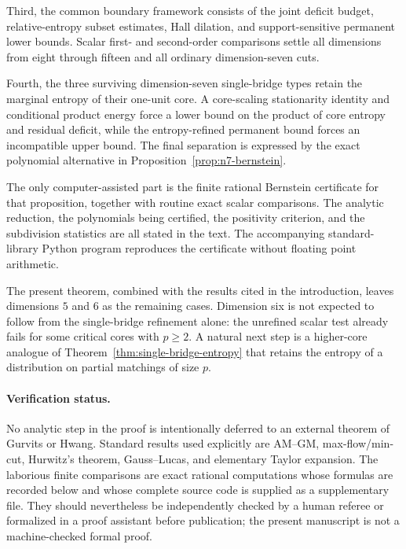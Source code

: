 \documentclass[11pt]{article}
\theoremstyle{definition}
\newcommand{\1}{\mathbf{1}}
\begin{document}
Third, the common boundary framework consists of the joint deficit budget,
relative-entropy subset estimates, Hall dilation, and support-sensitive
permanent lower bounds.  Scalar first- and second-order comparisons settle
all dimensions from eight through fifteen and all ordinary dimension-seven
cuts.

Fourth, the three surviving dimension-seven single-bridge types retain the
marginal entropy of their one-unit core.  A core-scaling stationarity identity
and conditional product energy force a lower bound on the product of core
entropy and residual deficit, while the entropy-refined permanent bound forces
an incompatible upper bound.  The final separation is expressed by the exact
polynomial alternative in Proposition~\ref{prop:n7-bernstein}.

The only computer-assisted part is the finite rational Bernstein certificate
for that proposition, together with routine exact scalar comparisons.  The
analytic reduction, the polynomials being certified, the positivity criterion,
and the subdivision statistics are all stated in the text.  The accompanying
standard-library Python program reproduces the certificate without floating
point arithmetic.

The present theorem, combined with the results cited in the introduction,
leaves dimensions $5$ and $6$ as the remaining cases.  Dimension six is not
expected to follow from the single-bridge refinement alone: the unrefined
scalar test already fails for some critical cores with $p\ge2$.  A natural
next step is a higher-core analogue of Theorem~\ref{thm:single-bridge-entropy}
that retains the entropy of a distribution on partial matchings of size
$p$.

\paragraph{Verification status.}
No analytic step in the proof is intentionally deferred to an external theorem of Gurvits or Hwang.  Standard results used explicitly are AM--GM, max-flow/min-cut, Hurwitz's theorem, Gauss--Lucas, and elementary Taylor expansion.  The laborious finite comparisons are exact rational computations whose formulas are recorded below and whose complete source code is supplied as a supplementary file.  They should nevertheless be independently checked by a human referee or formalized in a proof assistant before publication; the present manuscript is not a machine-checked formal proof.

\appendix
\end{document}
